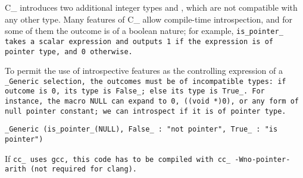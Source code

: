 C\_ introduces two additional integer types  and ,
which are not compatible with any other type.
Many features of C\_ allow compile-time introspection,
and for some of them the outcome is of a boolean nature;
for example, \tt{is_pointer_} takes a scalar expression and
outputs 1 if the expression is of pointer type, and 0 otherwise.

To permit the use of introspective features as the controlling expression
of a \tt{_Generic} selection, the outcomes must be of incompatible types:
if outcome is 0, its type is \tt{False_}; else its type is \tt{True_}.
For instance, the macro \tt{NULL} can expand to \tt{0}, \tt{((void *)0)}, or
any form of null pointer constant; we can introspect if it is of pointer type.

\example
\tt{_Generic (is_pointer_(NULL), False_ : "not pointer", True_ : "is pointer")}

\note If \tt{cc_} uses \tt{gcc}, this code has to be compiled
with \tt{cc_ -Wno-pointer-arith} (not required for \tt{clang}).
